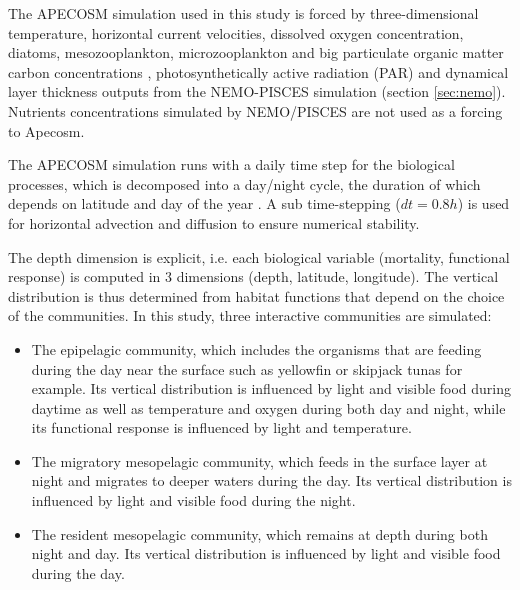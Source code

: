 

The APECOSM simulation used in this study is forced by three-dimensional temperature, horizontal current velocities, dissolved oxygen concentration, diatoms, mesozooplankton, microzooplankton and big particulate organic matter carbon concentrations \citep{aumontPISCESv2OceanBiogeochemical2015}, photosynthetically active radiation (PAR) and dynamical layer thickness outputs from the NEMO-PISCES simulation (section \ref{sec:nemo}). Nutrients concentrations simulated by NEMO/PISCES are not used as a forcing to Apecosm.

The APECOSM simulation runs with a daily time step for the biological processes, which is decomposed into a day/night cycle, the duration of which  depends on latitude and day of the year \citep{forsytheModelComparisonDaylength1995}. A sub time-stepping ($dt =0.8h$) is used for horizontal advection and diffusion to ensure numerical stability.

The depth dimension is explicit, i.e. each biological variable (mortality, functional response) is computed in 3 dimensions (depth, latitude, longitude). The vertical distribution is thus determined from habitat functions that depend on the choice of the communities. In this study, three interactive communities are simulated:
\begin{itemize}
\item{The epipelagic community, which includes the organisms that are feeding during the day near the surface such as yellowfin or skipjack tunas for example. Its vertical distribution is influenced by light and visible food during daytime as well as temperature and oxygen during both day and night, while its functional response is influenced by light and temperature.}
\item{The migratory mesopelagic community, which feeds in the surface layer at night and migrates to deeper waters during the day. Its vertical distribution is influenced by light and visible food during the night.}
\item{The resident mesopelagic community, which remains at depth during both night and day. Its vertical distribution is influenced by light and visible food during the day.}
\end{itemize}

